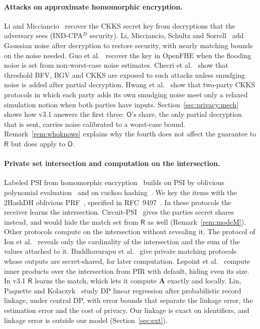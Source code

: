\documentclass[11pt]{article}
\theoremstyle{definition}
\theoremstyle{plain}
\newcommand{\bA}{\mathbf{A}}
\newcommand{\Party}[1]{\textsf{#1}}
\newcommand{\Rp}{\Party{R}}
\newcommand{\Op}{\Party{O}}
\begin{document}
\paragraph{Attacks on approximate homomorphic encryption.} Li and Micciancio~\cite{li2021security} recover the CKKS secret key from decryptions that the adversary sees (IND-CPA$^{D}$ security). Li, Micciancio, Schultz and Sorrell~\cite{li2022securing} add Gaussian noise after decryption to restore security, with nearly matching bounds on the noise needed. Guo et al.~\cite{guo2024key} recover the key in OpenFHE when the flooding noise is set from non-worst-case noise estimates. Checri et al.~\cite{checri2024practical} show that threshold BFV, BGV and CKKS are exposed to such attacks unless smudging noise is added after partial decryption. Hwang et al.~\cite{hwang2025insecurity} show that two-party CKKS protocols in which each party adds its own smudging noise meet only a relaxed simulation notion when both parties have inputs. Section~\ref{sec:privacy:mech} shows how v3.1 answers the first three: $\Op$'s share, the only partial decryption that is sent, carries noise calibrated to a worst-case bound. Remark~\ref{rem:whoknows} explains why the fourth does not affect the guarantee to $\Rp$ but does apply to $\Op$.

\paragraph{Private set intersection and computation on the intersection.} Labeled PSI from homomorphic encryption~\cite{chen2017fast,chen2018labeled,cong2021labeled} builds on PSI by oblivious polynomial evaluation~\cite{freedman2004efficient} and on cuckoo hashing~\cite{pagh2004cuckoo}. We key the items with the 2HashDH oblivious PRF~\cite{jarecki2014round}, specified in RFC~9497~\cite{rfc9497}. In these protocols the receiver learns the intersection. Circuit-PSI~\cite{pinkas2019efficient,rindal2021vole} gives the parties secret shares instead, and would hide the match set from $\Rp$ as well (Remark~\ref{rem:modeM}). Other protocols compute on the intersection without revealing it. The protocol of Ion et al.~\cite{ion2020deploying} reveals only the cardinality of the intersection and the sum of the values attached to it. Buddhavarapu et al.~\cite{buddhavarapu2020private} give private matching protocols whose outputs are secret-shared, for later computation. Lepoint et al.~\cite{lepoint2021private} compute inner products over the intersection from PIR with default, hiding even its size. In v3.1 $\Rp$ learns the match, which lets it compute $\bA$ exactly and locally. Lin, Paquette and Kolaczyk~\cite{lin2024differentially} study DP linear regression after probabilistic record linkage, under central DP, with error bounds that separate the linkage error, the estimation error and the cost of privacy. Our linkage is exact on identifiers, and linkage error is outside our model (Section~\ref{sec:ext}).
\end{document}
